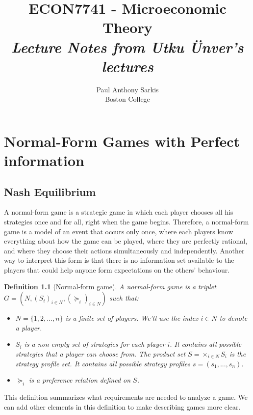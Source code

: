 \documentclass[12pt]{report}
\newtheorem{definition}{Definition}[chapter]
\begin{document}
\date{}
\title{\textbf{\huge{ECON7741 - Microeconomic Theory}}\\ \textit{Lecture Notes from Utku Ünver's lectures}}
\author{Paul Anthony Sarkis\\ Boston College} 
 
\maketitle

\tableofcontents

\chapter{Normal-Form Games with Perfect information}

\section{Nash Equilibrium}

A normal-form game is a strategic game in which each player chooses all his strategies once and for all, right when the game begins. Therefore, a normal-form game is a model of an event that occurs only once, where each players know everything about how the game can be played, where they are perfectly rational, and where they choose their actions simultaneously and independently. Another way to interpret this form is that there is no information set available to the players that could help anyone form expectations on the others' behaviour.

\begin{definition}[Normal-form game] A normal-form game is a triplet $G = (N, (S_i)_{i\in N}, (\succeq_i)_{i\in N})$ such that:\begin{itemize}
\item $N = \{1, 2, ..., n\}$ is a finite set of players. We'll use the index $i\in N$ to denote a player.
\item $S_i$ is a non-empty set of strategies for each player $i$. It contains all possible strategies that a player can choose from. The product set $S = \times_{i\in N} S_i$ is the strategy profile set. It contains all possible strategy profiles $s = (s_1, ..., s_n)$.
\item $\succeq_i$ is a preference relation defined on $S$.
\end{itemize}
\end{definition}

This definition summarizes what requirements are needed to analyze a game. We can add other elements in this definition to make describing games more clear.
\end{document}
